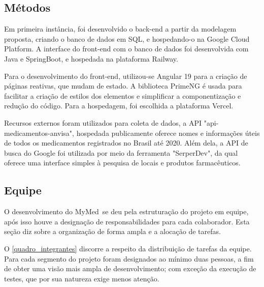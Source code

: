 \documentclass[
	article,			%
	12pt,				%
	oneside,			%
	a4paper,			%
    BIBLATEX,           %
	english,			%
	brazil,				%
	sumario=tradicional
	]{abntex2}
\newcommand\nomeprojeto{MyMed}
\begin{document}
\subsection{Métodos}

Em primeira instância, foi desenvolvido o back-end a partir da modelagem proposta, criando o banco de dados em SQL, e hospedando-o na Google Cloud Platform. A interface do front-end com o banco de dados foi desenvolvida com Java e SpringBoot, e hospedada na plataforma Railway.

Para o desenvolvimento do front-end, utilizou-se Angular 19 para a criação de páginas reativas, que mudam de estado. A biblioteca PrimeNG é usada para facilitar a criação de estilos dos elementos e simplificar a componentização e redução do código. Para a hospedagem, foi escolhida a plataforma Vercel.

Recursos externos foram utilizados para coleta de dados, a API "api-medicamentos-anvisa", hospedada publicamente oferece nomes e informações úteis de todos os medicamentos registrados no Brasil até 2020. Além dela, a API de busca do Google foi utilizada por meio da ferramenta "SerperDev", da qual oferece uma interface simples à pesquisa de locais e produtos farmacêuticos.

\subsection{Equipe}

O desenvolvimento do \nomeprojeto\ se deu pela estruturação do projeto em equipe, após isso houve a designação de responsabilidades para cada colaborador. Esta seção diz sobre a organização de forma ampla e a alocação de tarefas.

O \autoref{quadro_integrantes} discorre a respeito da distribuição de tarefas da equipe. Para cada segmento do projeto foram designados ao mínimo duas pessoas, a fim de obter uma visão mais ampla de desenvolvimento; com exceção da execução de testes, que por sua natureza exige menos atenção. 
\end{document}
